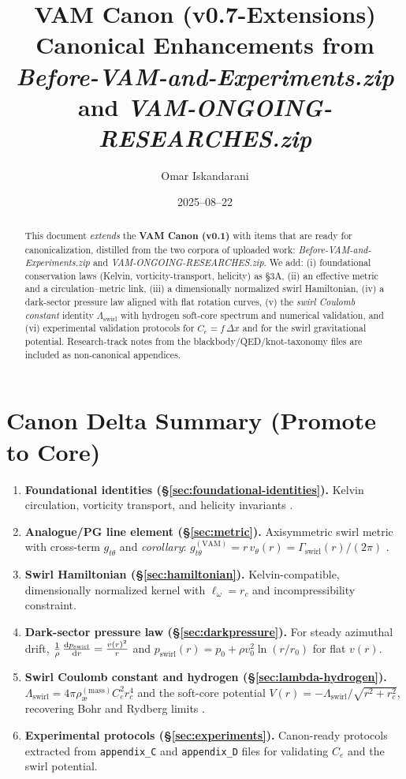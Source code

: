 \documentclass[11pt]{article}
\title{VAM Canon (v0.7-Extensions) \\ \large Canonical Enhancements from \emph{Before-VAM-and-Experiments.zip} and \emph{VAM-ONGOING-RESEARCHES.zip}}
\author{Omar Iskandarani}
\date{2025--08--22}
\newcommand{\aeMass}{\rho_{\text{\ae}}^{(\text{mass})}}
\newcommand{\Ce}{C_e}
\newcommand{\rc}{r_c}
\newcommand{\Lam}{\Lambda_{\text{swirl}}}
\begin{document}
\maketitle

\begin{abstract}
This document \emph{extends} the \textbf{VAM Canon (v0.1)} with items that are ready for canonicalization, distilled from the two corpora of uploaded work:
\emph{Before-VAM-and-Experiments.zip} and \emph{VAM-ONGOING-RESEARCHES.zip}. We add: (i) foundational conservation laws (Kelvin, vorticity-transport, helicity) as \S3A, (ii) an effective metric and a circulation--metric link, (iii) a dimensionally normalized swirl Hamiltonian, (iv) a dark-sector pressure law aligned with flat rotation curves, (v) the \emph{swirl Coulomb constant} identity \(\Lam\) with hydrogen soft-core spectrum and numerical validation, and (vi) experimental validation protocols for \(\Ce=f\,\Delta x\) and for the swirl gravitational potential. Research-track notes from the blackbody/QED/knot-taxonomy files are included as non-canonical appendices.
\end{abstract}

\section*{Canon Delta Summary (Promote to Core)}
\begin{enumerate}
  \item \textbf{Foundational identities (\S\ref{sec:foundational-identities}).} Kelvin circulation, vorticity transport, and helicity invariants \cite{Helmholtz1858,Kelvin1869,Moffatt1969,Batchelor1967,LandauLifshitz1987}.
  \item \textbf{Analogue/PG line element (\S\ref{sec:metric}).} Axisymmetric swirl metric with cross-term \(g_{t\theta}\) and \emph{corollary}: \(g^{(\mathrm{VAM})}_{t\theta}= r\,v_\theta(r) = \Gamma_{\text{swirl}}(r)/(2\pi)\) \cite{Unruh1981,Visser1998,Painleve1921,Gullstrand1922,Kerr1963}.
  \item \textbf{Swirl Hamiltonian (\S\ref{sec:hamiltonian}).} Kelvin-compatible, dimensionally normalized kernel with \(\ell_\omega=\rc\) and incompressibility constraint.
  \item \textbf{Dark-sector pressure law (\S\ref{sec:darkpressure}).} For steady azimuthal drift, \( \frac{1}{\rho}\,\dv{p_{\text{swirl}}}{r} = \frac{v(r)^2}{r}\) and \(p_{\text{swirl}}(r)=p_0+\rho v_0^2\ln(r/r_0)\) for flat \(v(r)\).
  \item \textbf{Swirl Coulomb constant and hydrogen (\S\ref{sec:lambda-hydrogen}).} \(\displaystyle \Lam = 4\pi \aeMass \Ce^2 \rc^4\) and the soft-core potential \(V(r)=-\Lam/\sqrt{r^2+\rc^2}\), recovering Bohr and Rydberg limits \cite{Jackson1999,Schrodinger1926}.
  \item \textbf{Experimental protocols (\S\ref{sec:experiments}).} Canon-ready protocols extracted from \texttt{appendix\_C} and \texttt{appendix\_D} files for validating \(\Ce\) and the swirl potential.
\end{enumerate}
\end{document}
